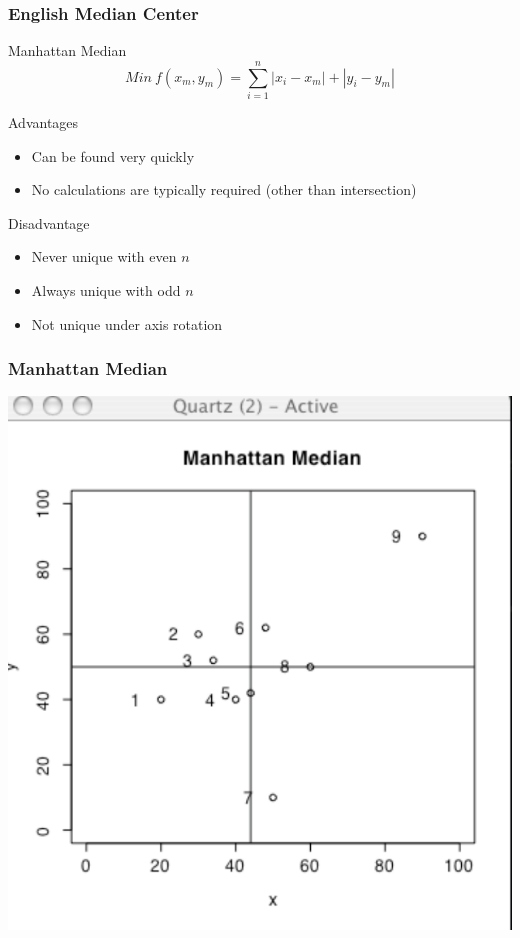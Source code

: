 \documentclass[nototal]{beamer}
\begin{document}
  \begin{frame}
    \frametitle{English Median Center}
    \begin{block}{Manhattan Median}
      \begin{equation}
	Min\ f(x_m,y_m)= \sum_{i=1}^n |x_i - x_m| + |y_i - y_m|
      \end{equation}

     \end{block}
\begin{block}{Advantages}
      \begin{itemize}
	\item Can be found very quickly
	\item No calculations are typically required (other than intersection)
      \end{itemize}
     \end{block}

\begin{block}{Disadvantage}
  \begin{itemize}
    \item Never unique with even $n$
    \item Always unique with odd $n$
    \item Not unique under axis rotation
  \end{itemize}
     \end{block}
   \end{frame}

\begin{frame}
   \frametitle{Manhattan Median}
   \begin{center}
     \includegraphics[width=.65\linewidth]{manhattan}
   \end{center}
 \end{frame}
\end{document}
